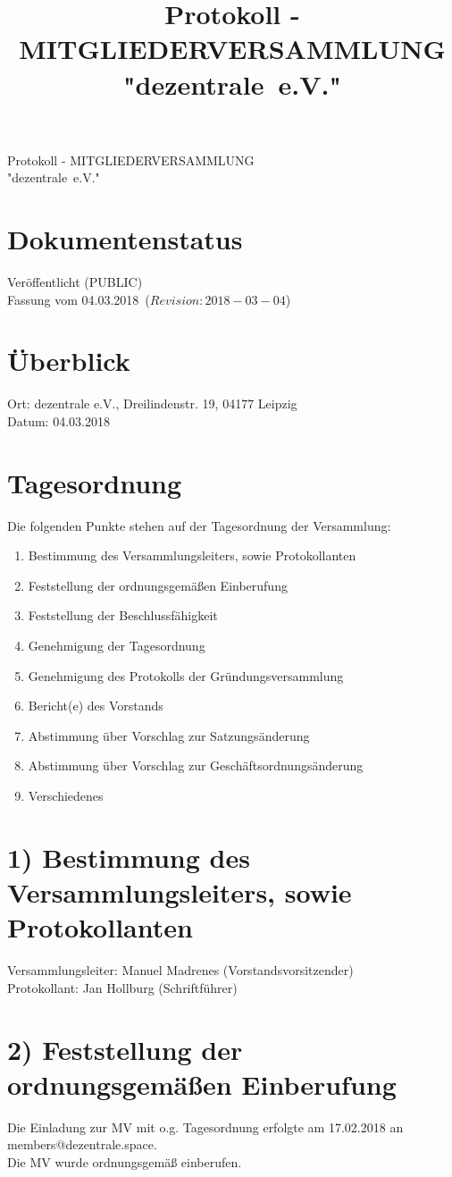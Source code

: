 \documentclass[10pt,a4paper]{scrartcl}
\newcommand{\qs}[1]{"#1"}
\newcommand{\name}{dezentrale}
\newcommand{\revision}{$Revision: 2018-03-04$}
\newcommand{\eventdate}{04.03.2018}
\newcommand{\documentstatus}{Ver{\"o}ffentlicht (PUBLIC)}
\begin{document}
\title{Protokoll - MITGLIEDERVERSAMMLUNG \qs{\name\ e.V.}}
{\LARGE Protokoll - MITGLIEDERVERSAMMLUNG\\ \qs{\name\ e.V.}}

\section*{Dokumentenstatus}
\documentstatus\\
Fassung vom \eventdate\ (\revision)

\section*{{\"U}berblick}
    Ort: dezentrale e.V., Dreilindenstr. 19, 04177 Leipzig\\
    Datum: \eventdate

\section*{Tagesordnung}
	Die folgenden Punkte stehen auf der Tagesordnung der Versammlung:
	\begin{enumerate}
		\item Bestimmung des Versammlungsleiters, sowie Protokollanten
		\item Feststellung der ordnungsgem{\"a}{\ss}en Einberufung
		\item Feststellung der Beschlussf{\"a}higkeit
		\item Genehmigung der Tagesordnung
		\item Genehmigung des Protokolls der Gr{\"u}ndungsversammlung
		\item Bericht(e) des Vorstands
		\item Abstimmung {\"u}ber Vorschlag zur Satzungs{\"a}nderung
		\item Abstimmung {\"u}ber Vorschlag zur Gesch{\"a}ftsordnungs{\"a}nderung
		\item Verschiedenes
	\end{enumerate}

\section*{1) Bestimmung des Versammlungsleiters, sowie Protokollanten}
	Versammlungsleiter: Manuel Madrenes (Vorstandsvorsitzender)\\
	Protokollant: Jan Hollburg (Schriftf{\"u}hrer)

\section*{2) Feststellung der ordnungsgem{\"a}{\ss}en Einberufung}
	Die Einladung zur MV mit o.g. Tagesordnung erfolgte am 17.02.2018 an members@dezentrale.space.\\
	Die MV wurde ordnungsgem{\"a}{\ss} einberufen.
\end{document}
